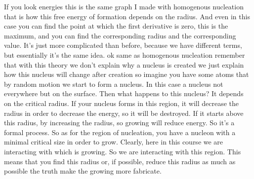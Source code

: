 If you look energies this is the same graph I made with homogenous nucleation that is how this free energy of formation depends on the radius. And even in this case you can find the point at which the first derivative is zero, this is the maximum, and you can find the corresponding radius and the corresponding value. It's just more complicated than before, because we have different terms, but essentially it's the same idea. ok same as homogenous nucleation remember that with this theory we don't explain why a nucleus is created we just explain how this nucleus will change after creation so imagine you have some atoms that by random motion we start to form a nucleus. In this case a nucleus not everywhere but on the surface. Then what happens to this nucleus? It depends on the critical radius. If your nucleus forms in this region, it will decrease the radius in order to decrease the energy, so it will be destroyed. If it starts above this radius, by increasing the radius, so growing will reduce energy. So it's a formal process. So as for the region of nucleation, you have a nucleon with a minimal critical size in order to grow. Clearly, here in this course we are interacting with which is growing. So we are interacting with this region. This means that you find this radius or, if possible, reduce this radius as much as possible the truth make the growing more fabricate.

